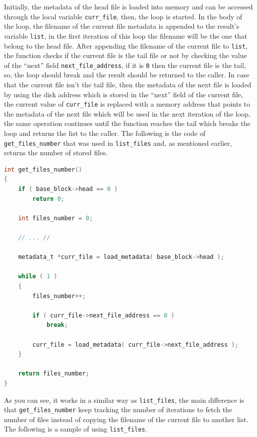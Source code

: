 Initially, the metadata of the head file is loaded into memory and can
be accessed through the local variable \lstinline!curr_file!, then, the
loop is started. In the body of the loop, the filename of the current
file metadata is appended to the result's variable \lstinline!list!, in
the first iteration of this loop the filename will be the one that
belong to the head file. After appending the filename of the current
file to \lstinline!list!, the function checks if the current file is the
tail file or not by checking the value of the ``next'' field
\lstinline!next_file_address!, if it is \lstinline!0! then the current
file is the tail, so, the loop should break and the result should be
returned to the caller. In case that the current file isn't the tail
file, then the metadata of the next file is loaded by using the disk
address which is stored in the ``next'' field of the current file, the
current value of \lstinline!curr_file! is replaced with a memory address
that points to the metadata of the next file which will be used in the
next iteration of the loop, the same operation continues until the
function reaches the tail which breaks the loop and returns the list to
the caller. The following is the code of \lstinline!get_files_number!
that was used in \lstinline!list_files! and, as mentioned earlier,
returns the number of stored files.

\begin{lstlisting}[language=C]
int get_files_number()
{
    if ( base_block->head == 0 )
        return 0;
    
    int files_number = 0;
    
    // ... //
    
    metadata_t *curr_file = load_metadata( base_block->head );
    
    while ( 1 )
    {
        files_number++;

        if ( curr_file->next_file_address == 0 )
            break;
        
        curr_file = load_metadata( curr_file->next_file_address );
    }
    
    return files_number;
}
\end{lstlisting}

As you can see, it works in a similar way as \lstinline!list_files!, the
main difference is that \lstinline!get_files_number! keep tracking the
number of iterations to fetch the number of files instead of copying the
filename of the current file to another list. The following is a sample
of using \lstinline!list_files!.

